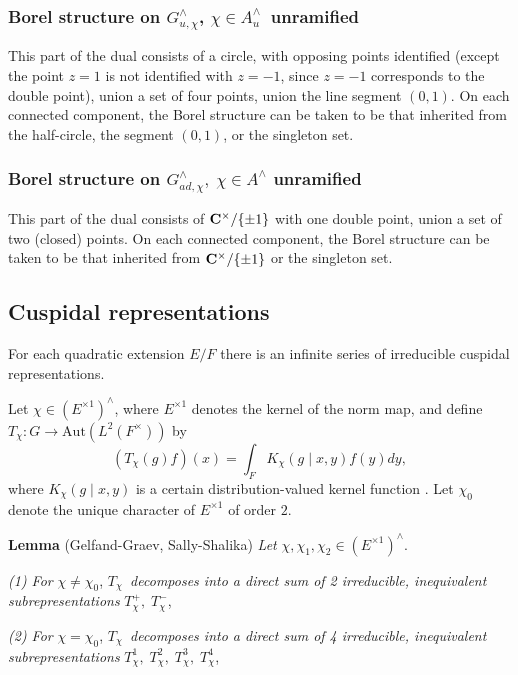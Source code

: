 \documentclass[11pt, a4paper]{article}
\begin{document}
\subsubsection{Borel structure on $G_{u,\chi }^{\wedge }$, $\chi \in
A_u^{\wedge }$\ unramified}

This part of the dual consists of a circle, with opposing points identified
(except the point $z=1$ is not identified with $z=-1$, since $z=-1$
corresponds to the double point), union a set of four points, union the
line segment $(0,1)$. On each connected component, the Borel structure can
be taken to be that inherited from the half-circle, the segment $(0,1)$, or
the singleton set.

\subsubsection{Borel structure on $G_{ad,\chi }^{\wedge },\;\chi \in
A^{\wedge }$ unramified}

This part of the dual consists of ${\bf C}^{\times }/\{\pm 1\}$ with
one double point, union a set of two (closed) points. On each connected
component, the Borel structure can be taken to be that inherited from
${\bf C}^{\times }/\{\pm 1\}$ or the singleton set.

\subsection{Cuspidal representations}

For each quadratic extension $E/F$ there is an infinite series of
irreducible cuspidal representations.

Let $\chi \in (E^{\times 1})^{\wedge }$, where $E^{\times 1}$ denotes the
kernel of the norm map, and define $T_\chi :G\rightarrow \mathrm{Aut}(L^2(F^{\times }))$ by
\[
(T_\chi (g)f)(x)=\int_FK_\chi (g\;|\;x,y)f(y)dy,
\]
where $K_\chi (g\;|\;x,y)$ is a certain distribution-valued kernel function
\cite{GG}. Let $\chi _0$ denote the unique character of $E^{\times 1}$ of order $%
2$.

{\bf Lemma} (Gelfand-Graev, Sally-Shalika) {\em Let }$\chi ,\chi _1,\chi
_2\in (E^{\times 1})^{\wedge }$.

{\em (1) For }$\chi \neq \chi _0$, $T_\chi ${\em \ decomposes into a
direct sum of 2 irreducible, inequivalent subrepresentations }$T_\chi
^{+},\;T_\chi ^{-}$,

{\em (2) For }$\chi =\chi _0$, $T_\chi ${\em \ decomposes into a
direct sum of 4 irreducible, inequivalent subrepresentations }$T_\chi
^1,\;T_\chi ^2,\;T_\chi ^3,\;T_\chi ^4$,
\end{document}
